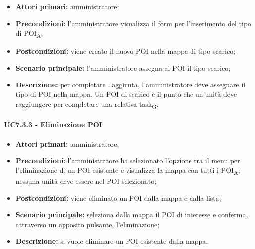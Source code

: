 \begin{itemize}

   \item   \textbf{Attori primari:} amministratore;

   \item   \textbf{Precondizioni:} l'amministratore visualizza il form per l'inserimento del tipo di POI\textsubscript{A};

   \item   \textbf{Postcondizioni:} viene creato il nuovo POI nella mappa di tipo scarico; 

   \item   \textbf{Scenario principale:} l'amministratore assegna al POI il tipo scarico;

  \item   \textbf{Descrizione:} per completare l'aggiunta, l'amministratore deve assegnare il tipo di POI nella mappa. Un POI di scarico è il punto che un'unità deve raggiungere per completare una relativa task\textsubscript{G}.



\end{itemize}





\paragraph{UC7.3.3 - Eliminazione POI}

\begin{itemize}

   \item   \textbf{Attori primari:} amministratore;

   \item   \textbf{Precondizioni:} l'amministratore ha selezionato l'opzione tra il menu per l'eliminazione di un POI esistente e visualizza la mappa con tutti i POI\textsubscript{A}; nessuna unità deve essere nel POI selezionato;

   \item   \textbf{Postcondizioni:} viene eliminato un POI dalla mappa e dalla lista; 

   \item   \textbf{Scenario principale:} seleziona dalla mappa il POI di interesse e conferma, attraverso un apposito pulsante, l'eliminazione;

   \item   \textbf{Descrizione:} si vuole eliminare un POI esistente dalla mappa.

\end{itemize}
